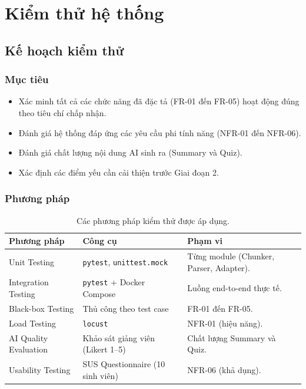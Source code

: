 \section{Kiểm thử hệ thống}

\subsection{Kế hoạch kiểm thử}

\subsubsection{Mục tiêu}

\begin{itemize}
    \item Xác minh tất cả các chức năng đã đặc tả (FR-01 đến FR-05) hoạt động
          đúng theo tiêu chí chấp nhận.
    \item Đánh giá hệ thống đáp ứng các yêu cầu phi tính năng (NFR-01 đến NFR-06).
    \item Đánh giá chất lượng nội dung AI sinh ra (Summary và Quiz).
    \item Xác định các điểm yếu cần cải thiện trước Giai đoạn 2.
\end{itemize}

\subsubsection{Phương pháp}

\begin{table}[H]
    \centering
    \caption{Các phương pháp kiểm thử được áp dụng.}
    \label{tab:test-methods}
    \begin{tabular}{p{3.5cm}p{4.5cm}p{6.5cm}}
        \toprule
        \textbf{Phương pháp} & \textbf{Công cụ} & \textbf{Phạm vi} \\
        \midrule
        Unit Testing & \texttt{pytest}, \texttt{unittest.mock} &
            Từng module (Chunker, Parser, Adapter). \\
        Integration Testing & \texttt{pytest} + Docker Compose &
            Luồng end-to-end thực tế. \\
        Black-box Testing & Thủ công theo test case & FR-01 đến FR-05. \\
        Load Testing & \texttt{locust} & NFR-01 (hiệu năng). \\
        AI Quality Evaluation & Khảo sát giảng viên (Likert 1--5) &
            Chất lượng Summary và Quiz. \\
        Usability Testing & SUS Questionnaire (10 sinh viên) &
            NFR-06 (khả dụng). \\
        \bottomrule
    \end{tabular}
\end{table}

